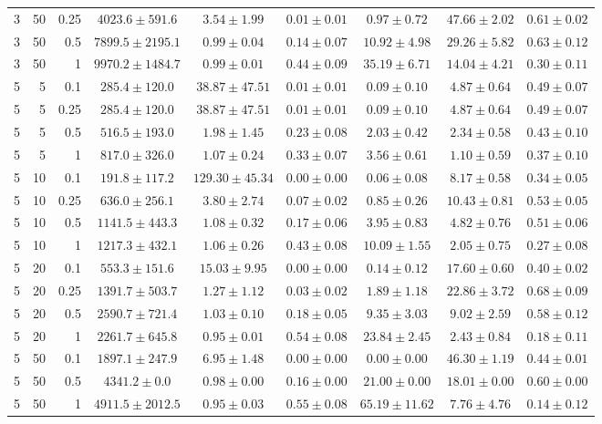 \begin{table}[htbp]
\begin{tabular}{@{}rrrcccccc@{}}
3 & 50 & 0.25 & $4023.6 \pm 591.6$ & $3.54 \pm 1.99$ & $0.01 \pm 0.01$ & $0.97 \pm 0.72$ & $47.66 \pm 2.02$ & $0.61 \pm 0.02$ \\
3 & 50 & 0.5 & $7899.5 \pm 2195.1$ & $0.99 \pm 0.04$ & $0.14 \pm 0.07$ & $10.92 \pm 4.98$ & $29.26 \pm 5.82$ & $0.63 \pm 0.12$ \\
3 & 50 & 1 & $9970.2 \pm 1484.7$ & $0.99 \pm 0.01$ & $0.44 \pm 0.09$ & $35.19 \pm 6.71$ & $14.04 \pm 4.21$ & $0.30 \pm 0.11$ \\
\midrule
5 & 5 & 0.1 & $285.4 \pm 120.0$ & $38.87 \pm 47.51$ & $0.01 \pm 0.01$ & $0.09 \pm 0.10$ & $4.87 \pm 0.64$ & $0.49 \pm 0.07$ \\
5 & 5 & 0.25 & $285.4 \pm 120.0$ & $38.87 \pm 47.51$ & $0.01 \pm 0.01$ & $0.09 \pm 0.10$ & $4.87 \pm 0.64$ & $0.49 \pm 0.07$ \\
5 & 5 & 0.5 & $516.5 \pm 193.0$ & $1.98 \pm 1.45$ & $0.23 \pm 0.08$ & $2.03 \pm 0.42$ & $2.34 \pm 0.58$ & $0.43 \pm 0.10$ \\
5 & 5 & 1 & $817.0 \pm 326.0$ & $1.07 \pm 0.24$ & $0.33 \pm 0.07$ & $3.56 \pm 0.61$ & $1.10 \pm 0.59$ & $0.37 \pm 0.10$ \\
5 & 10 & 0.1 & $191.8 \pm 117.2$ & $129.30 \pm 45.34$ & $0.00 \pm 0.00$ & $0.06 \pm 0.08$ & $8.17 \pm 0.58$ & $0.34 \pm 0.05$ \\
5 & 10 & 0.25 & $636.0 \pm 256.1$ & $3.80 \pm 2.74$ & $0.07 \pm 0.02$ & $0.85 \pm 0.26$ & $10.43 \pm 0.81$ & $0.53 \pm 0.05$ \\
5 & 10 & 0.5 & $1141.5 \pm 443.3$ & $1.08 \pm 0.32$ & $0.17 \pm 0.06$ & $3.95 \pm 0.83$ & $4.82 \pm 0.76$ & $0.51 \pm 0.06$ \\
5 & 10 & 1 & $1217.3 \pm 432.1$ & $1.06 \pm 0.26$ & $0.43 \pm 0.08$ & $10.09 \pm 1.55$ & $2.05 \pm 0.75$ & $0.27 \pm 0.08$ \\
5 & 20 & 0.1 & $553.3 \pm 151.6$ & $15.03 \pm 9.95$ & $0.00 \pm 0.00$ & $0.14 \pm 0.12$ & $17.60 \pm 0.60$ & $0.40 \pm 0.02$ \\
5 & 20 & 0.25 & $1391.7 \pm 503.7$ & $1.27 \pm 1.12$ & $0.03 \pm 0.02$ & $1.89 \pm 1.18$ & $22.86 \pm 3.72$ & $0.68 \pm 0.09$ \\
5 & 20 & 0.5 & $2590.7 \pm 721.4$ & $1.03 \pm 0.10$ & $0.18 \pm 0.05$ & $9.35 \pm 3.03$ & $9.02 \pm 2.59$ & $0.58 \pm 0.12$ \\
5 & 20 & 1 & $2261.7 \pm 645.8$ & $0.95 \pm 0.01$ & $0.54 \pm 0.08$ & $23.84 \pm 2.45$ & $2.43 \pm 0.84$ & $0.18 \pm 0.11$ \\
5 & 50 & 0.1 & $1897.1 \pm 247.9$ & $6.95 \pm 1.48$ & $0.00 \pm 0.00$ & $0.00 \pm 0.00$ & $46.30 \pm 1.19$ & $0.44 \pm 0.01$ \\
5 & 50 & 0.5 & $4341.2 \pm 0.0$ & $0.98 \pm 0.00$ & $0.16 \pm 0.00$ & $21.00 \pm 0.00$ & $18.01 \pm 0.00$ & $0.60 \pm 0.00$ \\
5 & 50 & 1 & $4911.5 \pm 2012.5$ & $0.95 \pm 0.03$ & $0.55 \pm 0.08$ & $65.19 \pm 11.62$ & $7.76 \pm 4.76$ & $0.14 \pm 0.12$ \\
\bottomrule
\end{tabular}
\end{table}
